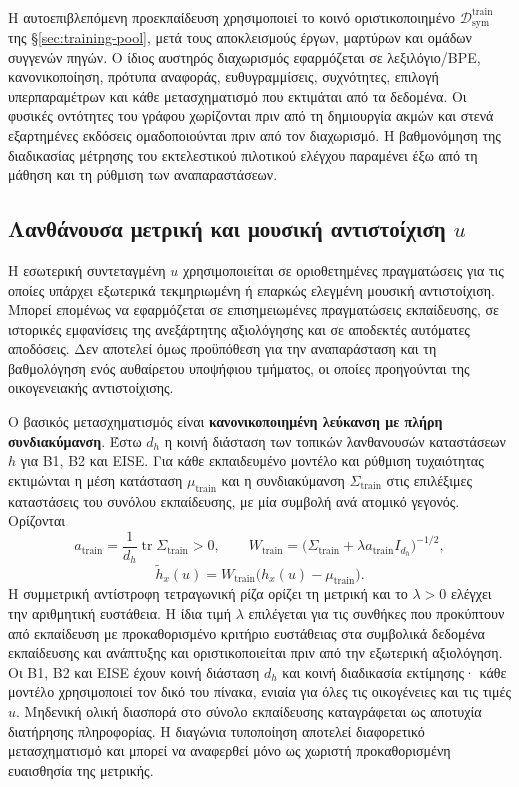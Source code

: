 \documentclass[11pt,a4paper]{article}
\begin{document}
Η αυτοεπιβλεπόμενη προεκπαίδευση χρησιμοποιεί το κοινό οριστικοποιημένο $\mathcal D_{\mathrm{sym}}^{\mathrm{train}}$ της \S\ref{sec:training-pool}, μετά τους αποκλεισμούς έργων, μαρτύρων και ομάδων συγγενών πηγών. Ο ίδιος αυστηρός διαχωρισμός εφαρμόζεται σε λεξιλόγιο/BPE, κανονικοποίηση, πρότυπα αναφοράς, ευθυγραμμίσεις, συχνότητες, επιλογή υπερπαραμέτρων και κάθε μετασχηματισμό που εκτιμάται από τα δεδομένα. Οι φυσικές οντότητες του γράφου χωρίζονται πριν από τη δημιουργία ακμών και στενά εξαρτημένες εκδόσεις ομαδοποιούνται πριν από τον διαχωρισμό. Η βαθμονόμηση της διαδικασίας μέτρησης του εκτελεστικού πιλοτικού ελέγχου παραμένει έξω από τη μάθηση και τη ρύθμιση των αναπαραστάσεων.

\subsection{\texorpdfstring{Λανθάνουσα μετρική και μουσική αντιστοίχιση \(u\)}{Λανθάνουσα μετρική και μουσική αντιστοίχιση u}}\label{sec:latent-metric}\label{app:eise-metric}

Η εσωτερική συντεταγμένη $u$ χρησιμοποιείται σε οριοθετημένες πραγματώσεις για τις οποίες υπάρχει εξωτερικά τεκμηριωμένη ή επαρκώς ελεγμένη μουσική αντιστοίχιση. Μπορεί επομένως να εφαρμόζεται σε επισημειωμένες πραγματώσεις εκπαίδευσης, σε ιστορικές εμφανίσεις της ανεξάρτητης αξιολόγησης και σε αποδεκτές αυτόματες αποδόσεις. Δεν αποτελεί όμως προϋπόθεση για την αναπαράσταση και τη βαθμολόγηση ενός αυθαίρετου υποψήφιου τμήματος, οι οποίες προηγούνται της οικογενειακής αντιστοίχισης.

Ο βασικός μετασχηματισμός είναι \textbf{κανονικοποιημένη λεύκανση με πλήρη συνδιακύμανση}. Έστω $d_h$ η κοινή διάσταση των τοπικών λανθανουσών καταστάσεων $h$ για B1, B2 και EISE. Για κάθε εκπαιδευμένο μοντέλο και ρύθμιση τυχαιότητας εκτιμώνται η μέση κατάσταση $\mu_{\mathrm{train}}$ και η συνδιακύμανση $\Sigma_{\mathrm{train}}$ στις επιλέξιμες καταστάσεις του συνόλου εκπαίδευσης, με μία συμβολή ανά ατομικό γεγονός. Ορίζονται
\[
a_{\mathrm{train}}=\frac{1}{d_h}\operatorname{tr}\Sigma_{\mathrm{train}}>0,
\qquad
W_{\mathrm{train}}
=\bigl(\Sigma_{\mathrm{train}}+\lambda a_{\mathrm{train}}I_{d_h}\bigr)^{-1/2},
\]
\[
\widetilde h_x(u)=W_{\mathrm{train}}\bigl(h_x(u)-\mu_{\mathrm{train}}\bigr).
\]
Η συμμετρική αντίστροφη τετραγωνική ρίζα ορίζει τη μετρική και το $\lambda>0$ ελέγχει την αριθμητική ευστάθεια. Η ίδια τιμή $\lambda$ επιλέγεται για τις συνθήκες που προκύπτουν από εκπαίδευση με προκαθορισμένο κριτήριο ευστάθειας στα συμβολικά δεδομένα εκπαίδευσης και ανάπτυξης και οριστικοποιείται πριν από την εξωτερική αξιολόγηση. Οι B1, B2 και EISE έχουν κοινή διάσταση $d_h$ και κοινή διαδικασία εκτίμησης· κάθε μοντέλο χρησιμοποιεί τον δικό του πίνακα, ενιαία για όλες τις οικογένειες και τις τιμές $u$. Μηδενική ολική διασπορά στο σύνολο εκπαίδευσης καταγράφεται ως αποτυχία διατήρησης πληροφορίας. Η διαγώνια τυποποίηση αποτελεί διαφορετικό μετασχηματισμό και μπορεί να αναφερθεί μόνο ως χωριστή προκαθορισμένη ευαισθησία της μετρικής.
\end{document}
